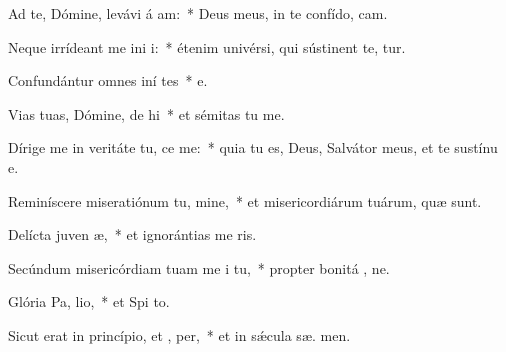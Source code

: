 \item Ad te, Dómine, levávi á am:~* Deus meus, in te confído,  cam.
\item Neque irrídeant me ini i:~* étenim univérsi, qui sústinent te,  tur.
\item Confundántur omnes iní tes~* e.
\item Vias tuas, Dómine, de hi~* et sémitas tu  me.
\item Dírige me in veritáte tu,  ce me:~* quia tu es, Deus, Salvátor meus, et te sustínu  e.
\item Reminíscere miseratiónum tu, mine,~* et misericordiárum tuárum, quæ   sunt.
\item Delícta juven æ,~* et ignorántias me  ris.
\item Secúndum misericórdiam tuam me i tu,~* propter bonitá , ne.
\item Glória Pa,  lio,~* et Spi to.
\item Sicut erat in princípio, et ,  per,~* et in sǽcula sæ. men.
